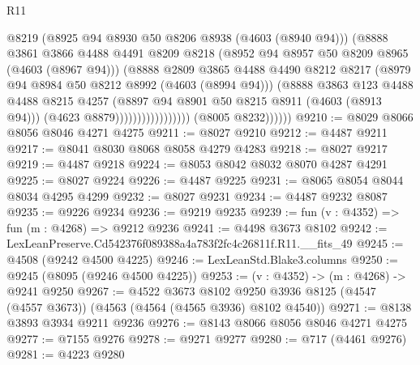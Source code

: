 \begin{lexlean}{R11}
\begin{coremodule}
                                        @8219
                                        (@8925 @94 @8930 @50 @8206 @8938 (@4603 (@8940 @94)))
                                        (@8888
                                          @3861
                                          @3866
                                          @4488
                                          @4491
                                          @8209
                                          @8218
                                          (@8952 @94 @8957 @50 @8209 @8965 (@4603 (@8967 @94)))
                                          (@8888
                                            @2809
                                            @3865
                                            @4488
                                            @4490
                                            @8212
                                            @8217
                                            (@8979 @94 @8984 @50 @8212 @8992 (@4603 (@8994 @94)))
                                            (@8888
                                              @3863
                                              @123
                                              @4488
                                              @4488
                                              @8215
                                              @4257
                                              (@8897 @94 @8901 @50 @8215 @8911 (@4603 (@8913 @94)))
                                              (@4623 @8879)))))))))))))))))
              (@8005 @8232))))))
@9210 := @8029 @8066 @8056 @8046 @4271 @4275
@9211 := @8027 @9210
@9212 := @4487 @9211
@9217 := @8041 @8030 @8068 @8058 @4279 @4283
@9218 := @8027 @9217
@9219 := @4487 @9218
@9224 := @8053 @8042 @8032 @8070 @4287 @4291
@9225 := @8027 @9224
@9226 := @4487 @9225
@9231 := @8065 @8054 @8044 @8034 @4295 @4299
@9232 := @8027 @9231
@9234 := @4487 @9232 @8087
@9235 := @9226 @9234
@9236 := @9219 @9235
@9239 := fun (v : @4352) => fun (m : @4268) => @9212 @9236
@9241 := @4498 @3673 @8102
@9242 := LexLeanPreserve.Cd542376f089388a4a783f2fc4c26811f.R11.__fits_49
@9245 := @4508 (@9242 @4500 @4225)
@9246 := LexLeanStd.Blake3.columns
@9250 := @9245 (@8095 (@9246 @4500 @4225))
@9253 := (v : @4352) -> (m : @4268) -> @9241 @9250
@9267 := @4522
    @3673
    @8102
    @9250
    @3936
    @8125
    (@4547 (@4557 @3673))
    (@4563 (@4564 (@4565 @3936) @8102 @4540))
@9271 := @8138 @3893 @3934 @9211 @9236
@9276 := @8143 @8066 @8056 @8046 @4271 @4275
@9277 := @7155 @9276
@9278 := @9271 @9277
@9280 := @717 (@4461 @9276)
@9281 := @4223 @9280

\end{coremodule}
\end{lexlean}
